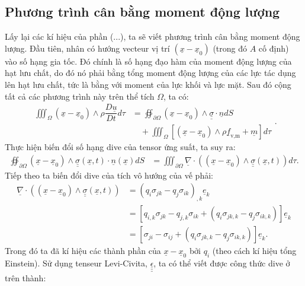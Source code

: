 \documentclass[../../../main.tex]{subfiles}
\begin{document}
\subsection{Phương trình cân bằng moment động lượng}
	Lấy lại các kí hiệu của phần (...), ta sẽ viết phương trình cân bằng moment động lượng. Đầu tiên, nhân có hướng vecteur vị trí $\left(\underline{x}-\underline{x}_0\right)$ (trong đó $A$ cố định) vào số hạng gia tốc. Đó chính là số hạng đạo hàm của moment động lượng của hạt lưu chất, do đó nó phải bằng tổng moment động lượng của các lực tác dụng lên hạt lưu chất, tức là bằng với moment của lực khối và lực mặt. Sau đó cộng tất cả các phương trình này trên thể tích $\Omega$, ta có:
		\begin{equation}
			\begin{aligned}	
				\iiint_{\Omega}\left(\underline{x}-\underline{x}_0\right)\wedge\rho\dfrac{D\underline{u}}{Dt}d\tau&=\oiint_{\partial\Omega}\left(\underline{x}-\underline{x}_0\right)\wedge\underline{\underline{\sigma}}\cdot\underline{n}dS\\
				&\quad+\iiint_{\Omega}\left[\left(\underline{x}-\underline{x}_0\right)\wedge\rho\underline{f}_{\text{v,m}}+\underline{m}\right]d\tau
			\end{aligned}.
		\end{equation}
	Thực hiện biến đổi số hạng dive của tensor ứng suất, ta suy ra:
		\[
			\begin{aligned}
				\oiint_{\partial\Omega}\left(\underline{x}-\underline{x}_0\right)\wedge\underline{\underline{\sigma}}\left(\underline{x},t\right)\cdot\underline{n}\left(\underline{x}\right)dS&=\iiint_{\partial\Omega}\underline{\nabla}\cdot\left(\left(\underline{x}-\underline{x}_0\right)\wedge\underline{\underline{\sigma}}\left(\underline{x},t\right)\right)d\tau.
			\end{aligned}
		\]
	Tiếp theo ta biến đổi dive của tích vô hướng của vế phải:
		\[
			\begin{aligned}
				\underline{\nabla}\cdot\left(\left(\underline{x}-\underline{x}_0\right)\wedge\underline{\underline{\sigma}}(\underline{x},t)\right)&=(q_i\sigma_{jk}-q_j\sigma_{ik})_{,k}\underline{e}_k\\
				&=\left[q_{i,k}\sigma_{jk}-q_{j,k}\sigma_{ik}+(q_i\sigma_{jk,k}-q_j\sigma_{ik,k})\right]\underline{e}_k\\
				&=\left[\sigma_{ji}-\sigma_{ij}+(q_i\sigma_{jk,k}-q_j\sigma_{ik,k})\right]\underline{e}_k.
			\end{aligned}
		\]
	Trong đó ta đã kí hiệu các thành phần của $\underline{x}-\underline{x}_0$ bởi $q_i$ (theo cách kí hiệu tổng Einstein). Sử dụng tenseur Levi-Civita, $\underline{\underline{\underline{\epsilon}}}$, ta có thể viết được công thức dive ở trên thành:
\end{document}

